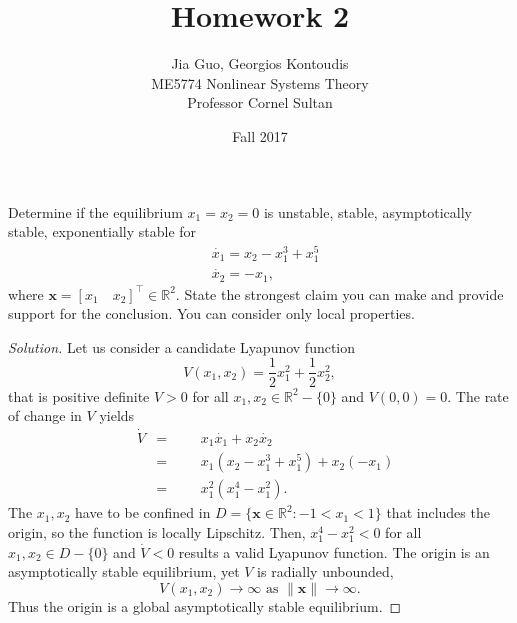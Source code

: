 \documentclass[12pt]{article}
\newenvironment{problem}[2][Problem]{\begin{trivlist}
\item[\hskip \labelsep {\bfseries #1}\hskip \labelsep {\bfseries #2.}]}{\end{trivlist}}
\newenvironment{solution}{\begin{proof}[Solution]}{\end{proof}}
\begin{document}
 
 
\title{Homework 2}
\author{Jia Guo, Georgios Kontoudis\\ 
ME5774 Nonlinear Systems Theory\\
Professor Cornel Sultan} 
\date{Fall 2017}
 
\maketitle
\begin{problem}{1} %
Determine if the equilibrium $x_1=x_2=0$ is unstable, stable, asymptotically stable, exponentially stable for
\begin{align*}
&\dot{x_1}=x_2-x_1^3+x_1^5 \\
&\dot{x_2}=-x_1,
\end{align*}
where $\textbf{x}=[x_1 \quad x_2]^\top \in \mathbb{R}^2$. State the strongest claim you can make and provide support for the conclusion. You can consider only local properties.
\end{problem}
\begin{solution}
Let us consider a candidate Lyapunov function
\begin{equation*}
V(x_1,x_2)=\frac{1}{2}x_1^2+\frac{1}{2}x_2^2,
\end{equation*}
that is positive definite $V>0$ for all $x_1,x_2 \in \mathbb{R}^2-\{0 \}$ and $V(0,0)=0$. The rate of change in $V$ yields
\begin{equation*}
\begin{aligned}
& \dot{V}
&  =
&&& x_1\dot{x_1}+x_2\dot{x_2}\\
&& =
&&& x_1(x_2-x_1^3+x_1^5)+x_2(-x_1)\\
&& =
&&& x_1^2(x_1^4-x_1^2).
\end{aligned}
\end{equation*} 
The $x_1,x_2$ have to be confined in $D=\{ \textbf{x} \in \mathbb{R}^2 : -1<x_1<1\}$ that includes the origin, so the function is locally Lipschitz. Then, $x_1^4-x_1^2<0$ for all $x_1,x_2 \in D-\{0 \}$ and $\dot{V}<0$ results a valid Lyapunov function. The origin is an asymptotically stable equilibrium, yet $V$ is radially unbounded,
\begin{equation*}
V(x_1,x_2) \rightarrow \infty \mbox{ as } \| \textbf{x}\| \rightarrow \infty.
\end{equation*}
Thus the origin is a global asymptotically stable equilibrium.
\end{solution}
\end{document}
